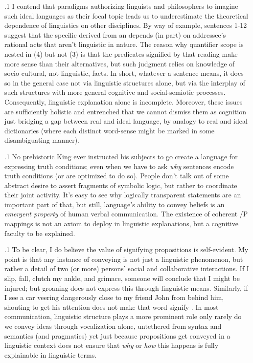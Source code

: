 \documentclass[11pt, twocolumn]{article}
\begin{document}
\p.1{%
I contend that paradigms authorizing linguists and philosophers to
imagine such ideal languages \mdash{} as their focal topic \mdash{} leads us
to underestimate the theoretical dependence of linguistics
on other disciplines.  By way of example, sentences 1-12 suggest
that the specific  derived from an 
depends (in part) on addressee's rational acts that aren't linguistic
in nature.  The reason why quantifier scope is nested in \exsRef(4) but not \exsRef(3) is that
the predicates signified by that reading make more sense than their
alternatives, but such judgment relies on knowledge of socio-cultural, not
linguistic, facts.  In short, whatever a sentence means, it does so
\mdash{} in the general case \mdash{} not via linguistic structures alone, but
via the interplay of such structures with more general cognitive
and social-semiotic processes.  Consequently, linguistic
explanation alone is incomplete.  Moreover, these issues are sufficiently
holistic and entrenched that we cannot dismiss them as cognition
just bridging a gap between real and ideal language, by analogy to
real and ideal dictionaries (where each distinct word-sense might
be marked in some disambiguating manner).
} %

\p.1{%
No prehistoric King ever instructed his subjects to go create a
language for expressing truth conditions; even when  we have to ask \textit{why} sentences encode truth conditions (or
are optimized to do so).  People don't talk out of some abstract desire
to assert fragments of symbolic logic, but rather to coordinate their joint
activity.  It's easy to see why logically transparent statements are an
important part of that, but still, language's ability to convey beliefs
is an \textit{emergent property} of human verbal communication.
The existence of coherent /P mappings is not an axiom to
deploy in linguistic explanations, but a cognitive faculty to be explained.
} %

\p.1{%
To be clear, I do believe the value of signifying propositions is
self-evident.  My point is that any instance of  conveying 
is not just a linguistic phenomenon, but rather a detail of
two (or more) persons' social and collaborative interactions.
If I slip, fall, clutch my ankle, and grimace, someone will
conclude that I might be injured; but groaning  does not
express this through linguistic means.  Similarly, if I see a
car veering dangerously close to my friend John from behind him, shouting
 to get his attention does not make that word signify
.  In most communication, linguistic structure
plays a more prominent role \mdash{} only rarely do we convey ideas through vocalization
alone, untethered from syntax and semantics (and pragmatics) \mdash{}
yet just because propositions get conveyed
in a linguistic context does not ensure that \textit{why} or \textit{how} this
happens is fully explainable in linguistic terms.
} %
\end{document}
